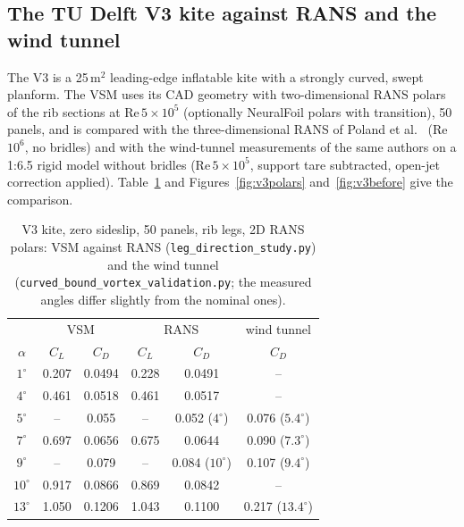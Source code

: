 \documentclass[11pt,a4paper]{article}
\newcommand{\code}[1]{\texttt{#1}}
\begin{document}
\subsection{The TU Delft V3 kite against RANS and the wind tunnel}
\label{sec:val-v3}
The V3 is a 25\,m$^2$ leading-edge inflatable kite with a strongly curved, swept planform. The VSM uses its CAD geometry with two-dimensional RANS polars of the rib sections at Re\,$5\times10^5$ (optionally NeuralFoil polars with transition), 50 panels, and is compared with the three-dimensional RANS of Poland et al.~\cite{poland2026} (Re\,$10^6$, no bridles) and with the wind-tunnel measurements of the same authors on a 1:6.5 rigid model without bridles (Re\,$5\times10^5$, support tare subtracted, open-jet correction applied). Table~\ref{tab:v3} and Figures~\ref{fig:v3polars} and~\ref{fig:v3before} give the comparison.

\begin{table}[t]\centering\small
\caption{V3 kite, zero sideslip, 50 panels, rib legs, 2D RANS polars: VSM against RANS (\code{leg\_direction\_study.py}) and the wind tunnel (\code{curved\_bound\_vortex\_validation.py}; the measured angles differ slightly from the nominal ones).}
\label{tab:v3}
\begin{tabular}{c|cc|cc|c}
\toprule
 & \multicolumn{2}{c|}{VSM} & \multicolumn{2}{c|}{RANS} & wind tunnel\\
$\alpha$ & $C_L$ & $C_D$ & $C_L$ & $C_D$ & $C_D$\\
\midrule
$1^\circ$ & 0.207 & 0.0494 & 0.228 & 0.0491 & --\\
$4^\circ$ & 0.461 & 0.0518 & 0.461 & 0.0517 & --\\
$5^\circ$ & -- & 0.055 & -- & 0.052 ($4^\circ$) & 0.076 ($5.4^\circ$)\\
$7^\circ$ & 0.697 & 0.0656 & 0.675 & 0.0644 & 0.090 ($7.3^\circ$)\\
$9^\circ$ & -- & 0.079 & -- & 0.084 ($10^\circ$) & 0.107 ($9.4^\circ$)\\
$10^\circ$ & 0.917 & 0.0866 & 0.869 & 0.0842 & --\\
$13^\circ$ & 1.050 & 0.1206 & 1.043 & 0.1100 & 0.217 ($13.4^\circ$)\\
\bottomrule
\end{tabular}
\end{table}
\end{document}
